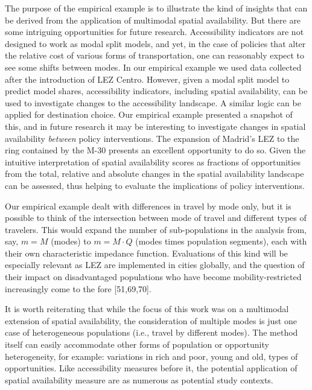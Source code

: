 \documentclass[10pt,letterpaper]{article}
\begin{document}
The purpose of the empirical example is to illustrate the kind of
insights that can be derived from the application of multimodal spatial
availability. But there are some intriguing opportunities for future
research. Accessibility indicators are not designed to work as modal
split models, and yet, in the case of policies that alter the relative
cost of various forms of transportation, one can reasonably expect to
see some shifts between modes. In our empirical example we used data
collected after the introduction of LEZ Centro. However, given a modal
split model to predict model shares, accessibility indicators, including
spatial availability, can be used to investigate changes to the
accessibility landscape. A similar logic can be applied for destination
choice. Our empirical example presented a snapshot of this, and in
future research it may be interesting to investigate changes in spatial
availability \emph{between} policy interventions. The expansion of
Madrid's LEZ to the ring contained by the M-30 presents an excellent
opportunity to do so. Given the intuitive interpretation of spatial
availability scores as fractions of opportunities from the total,
relative and absolute changes in the spatial availability landscape can
be assessed, thus helping to evaluate the implications of policy
interventions.

Our empirical example dealt with differences in travel by mode only, but
it is possible to think of the intersection between mode of travel and
different types of travelers. This would expand the number of
sub-populations in the analysis from, say, \(m=M\) (modes) to
\(m = M\cdot Q\) (modes times population segments), each with their own
characteristic impedance function. Evaluations of this kind will be
especially relevant as LEZ are implemented in cities globally, and the
question of their impact on disadvantaged populations who have become
mobility-restricted increasingly come to the fore {[}51,69,70{]}.

It is worth reiterating that while the focus of this work was on a
multimodal extension of spatial availability, the consideration of
multiple modes is just one case of heterogeneous populations (i.e.,
travel by different modes). The method itself can easily accommodate
other forms of population or opportunity heterogeneity, for example:
variations in rich and poor, young and old, types of opportunities. Like
accessibility measures before it, the potential application of spatial
availability measure are as numerous as potential study contexts.
\end{document}
